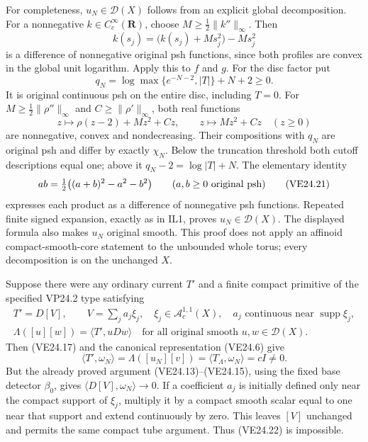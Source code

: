 For completeness, \(u_N\in\mathcal D(X)\) follows from an
explicit global decomposition. For a nonnegative
\(k\in C_c^\infty(\mathbf R)\), choose
\(M\ge\tfrac12\|k''\|_\infty\). Then
\[
 k(s_j)=\bigl(k(s_j)+Ms_j^2\bigr)-Ms_j^2
 \tag{VE24.18}
\]
is a difference of nonnegative original psh functions, since
both profiles are convex in the global unit logarithm. Apply
this to \(f\) and \(g\). For the disc factor put
\[
 q_N=\log\max\{e^{-N-2},|T|\}+N+2\ge0.
 \tag{VE24.19}
\]
It is original continuous psh on the entire disc, including
\(T=0\). For
\(M\ge\tfrac12\|\rho''\|_\infty\) and
\(C\ge\|\rho'\|_\infty\), both real functions
\[
 z\longmapsto\rho(z-2)+Mz^2+Cz,
 \qquad z\longmapsto Mz^2+Cz
 \quad(z\ge0)
 \tag{VE24.20}
\]
are nonnegative, convex and nondecreasing. Their compositions
with \(q_N\) are original psh and differ by exactly \(\chi_N\).
Below the truncation threshold both cutoff descriptions equal
one; above it \(q_N-2=\log|T|+N\). The elementary identity
\[
 ab=\tfrac12\bigl((a+b)^2-a^2-b^2\bigr)
       \qquad(a,b\ge0\hbox{ original psh})
 \tag{VE24.21}
\]
expresses each product as a difference of nonnegative psh
functions. Repeated finite signed expansion, exactly as in
IL1, proves \(u_N\in\mathcal D(X)\). The displayed formula
also makes \(u_N\) original smooth. This proof does not apply
an affinoid compact-smooth-core statement to the unbounded
whole torus; every decomposition is on the unchanged \(X\).

Suppose there were any ordinary current \(T'\) and a finite
compact primitive of the specified VP24.2 type satisfying
\[
 \begin{gathered}
 T'=D[V],\qquad V=\sum_j a_j\xi_j,
 \quad \xi_j\in\mathcal A_c^{1,1}(X),\quad
 a_j\text{ continuous near }\operatorname{supp}\xi_j,\\
 \Lambda([u][w])=\langle T',uDw\rangle
       \quad\text{for all original smooth }u,w\in\mathcal D(X).
 \end{gathered}
 \tag{VE24.22}
\]
Then (VE24.17) and the canonical representation (VE24.6) give
\[
 \langle T',\omega_N\rangle
       =\Lambda([u_N][v])
       =\langle T_\Lambda,\omega_N\rangle=cI\ne0.
 \tag{VE24.23}
\]
But the already proved argument (VE24.13)--(VE24.15), using
the fixed base detector \(\beta_0\), gives
\(\langle D[V],\omega_N\rangle\to0\). If a coefficient
\(a_j\) is initially defined only near the compact support
of \(\xi_j\), multiply it by a compact smooth scalar equal
to one near that support and extend continuously by zero.
This leaves \([V]\) unchanged and permits the same compact
tube argument. Thus (VE24.22) is impossible.


